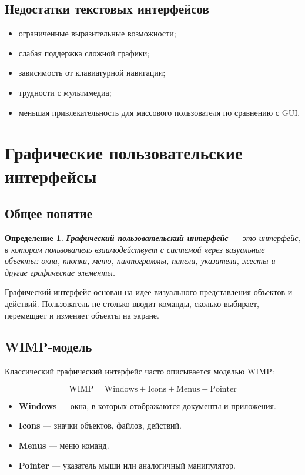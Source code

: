 \documentclass[12pt,a4paper]{article}
\newtheorem{definition}{Определение}
\begin{document}
\subsection{Недостатки текстовых интерфейсов}

\begin{itemize}
    \item ограниченные выразительные возможности;
    \item слабая поддержка сложной графики;
    \item зависимость от клавиатурной навигации;
    \item трудности с мультимедиа;
    \item меньшая привлекательность для массового пользователя по сравнению с GUI.
\end{itemize}

\section{Графические пользовательские интерфейсы}

\subsection{Общее понятие}

\begin{definition}
\textbf{Графический пользовательский интерфейс} --- это интерфейс, в котором пользователь взаимодействует с системой через визуальные объекты: окна, кнопки, меню, пиктограммы, панели, указатели, жесты и другие графические элементы.
\end{definition}

Графический интерфейс основан на идее визуального представления объектов и действий. Пользователь не столько вводит команды, сколько выбирает, перемещает и изменяет объекты на экране.

\subsection{WIMP-модель}

Классический графический интерфейс часто описывается моделью WIMP:

\[
\text{WIMP} = \text{Windows} + \text{Icons} + \text{Menus} + \text{Pointer}
\]

\begin{itemize}
    \item \textbf{Windows} --- окна, в которых отображаются документы и приложения.
    \item \textbf{Icons} --- значки объектов, файлов, действий.
    \item \textbf{Menus} --- меню команд.
    \item \textbf{Pointer} --- указатель мыши или аналогичный манипулятор.
\end{itemize}
\end{document}
